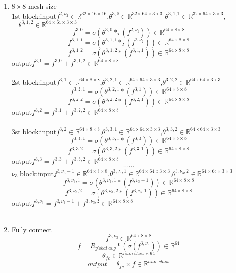 \begin{enumerate}
\\ \hspace*{\fill} \\
\item $8\times 8$ mesh size\\
1st block:\quad input\quad $f^{2,\nu_2}\in\mathbb{R}^{32\times 16\times 16}$,\quad$\theta^{3,0} \in \mathbb{R}^{32\times 64\times 3\times 3}$ $\theta^{3,1,1} \in \mathbb{R}^{32\times 64\times 3\times 3}$,$\quad \theta^{3,1,2} \in \mathbb{R}^{64\times 64\times 3\times 3}$
$$f^{3,0}=\sigma (\theta^{3,0} \ast_2 (f^{2,\nu_2}))\in \mathbb{R}^{64\times 8\times 8}$$
$$f^{3,1,1}=\sigma (\theta^{3,1,1} \ast_2 (f^{2,\nu_2}))\in \mathbb{R}^{64\times 8\times 8}$$
$$f^{3,1,2}=\sigma (\theta^{3,1,2} \ast (f^{3,1,1}))\in \mathbb{R}^{64\times 8\times 8}$$
\quad\quad\quad\quad\quad output\quad $f^{3,1}=f^{3,0}+f^{3,1,2} \in \mathbb{R}^{64\times 8\times 8}$
\\ \hspace*{\fill} \\
2st block:\quad input\quad $f^{3,1}\in \mathbb{R}^{64\times 8\times 8}$,\quad $\theta^{3,2,1} \in \mathbb{R}^{64\times 64\times 3\times 3}$,\quad $\theta^{3,2,2} \in \mathbb{R}^{64\times 64\times 3\times 3}$
$$f^{3,2,1}=\sigma (\theta^{3,2,1} \ast (f^{3,1}))\in \mathbb{R}^{64\times 8\times 8}$$
$$f^{3,2,2}=\sigma (\theta^{3,2,2} \ast (f^{3,2,1}))\in \mathbb{R}^{64\times 8\times 8}$$
\quad\quad\quad\quad\quad output\quad $f^{3,2}=f^{3,1}+f^{3,2,2} \in \mathbb{R}^{64\times 8\times 8}$
\\ \hspace*{\fill} \\
3st block:\quad input\quad $f^{3,2}\in \mathbb{R}^{64\times 8\times 8}$,\quad $\theta^{3,3,1} \in \mathbb{R}^{64\times 64\times 3\times 3}$,\quad $\theta^{3,3,2} \in \mathbb{R}^{64\times 64\times 3\times 3}$
$$f^{3,3,1}=\sigma (\theta^{3,3,1} \ast (f^{3,3}))\in \mathbb{R}^{64\times 8\times 8}$$
$$f^{3,3,2}=\sigma (\theta^{3,3,2} \ast (f^{3,3,1}))\in \mathbb{R}^{64\times 8\times 8}$$
\quad\quad\quad\quad\quad output\quad $f^{3,3}=f^{3,3}+f^{3,3,2} \in \mathbb{R}^{64\times 8\times 8}$
$$\cdots\cdots$$
$\nu_3$ block:\quad input\quad $f^{3,\nu_3-1}\in \mathbb{R}^{64\times 8\times 8}$,\quad $\theta^{3,\nu_3,1} \in \mathbb{R}^{64\times 64\times 3\times 3}$,\quad $\theta^{3,\nu_3,2} \in \mathbb{R}^{64\times 64\times 3\times 3}$
$$f^{3,\nu_3,1}=\sigma (\theta^{3,\nu_3,1} \ast (f^{3,\nu_3-1}))\in \mathbb{R}^{64\times 8\times 8}$$
$$f^{3,\nu_3,2}=\sigma (\theta^{3,\nu_3,2} \ast (f^{3,\nu_3,1}))\in \mathbb{R}^{64\times 8\times 8}$$
\quad\quad\quad\quad\quad output\quad $f^{3,\nu_3}=f^{3,\nu_3-1}+f^{3,\nu_3,2} \in \mathbb{R}^{64\times 8\times 8}$
\\ \hspace*{\fill} \\
\item Fully connect
$$f^{3,\nu_3} \in \mathbb{R}^{64\times 8\times 8}$$
$$f = R_{global~avg} \ast(\sigma(f^{3,\nu_3})) \in \mathbb{R}^{64}$$
$$\theta_{fc} \in \mathbb{R}^{num~class\times 64}$$
$$output = \theta_{fc}\times f \in \mathbb{R}^{num~class}$$
\end{enumerate}
